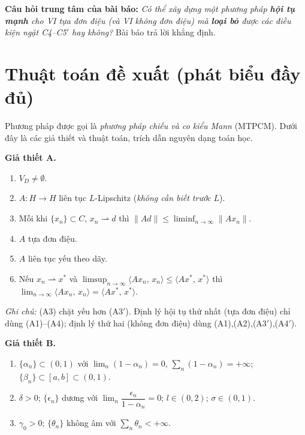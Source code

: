 \documentclass{MyBook}
\theoremstyle{plain}
\theoremstyle{definition}
\newcommand{\inp}[2]{\langle #1,\,#2\rangle}
\newcommand{\nm}[1]{\lVert #1\rVert}
\newcommand{\wto}{\rightharpoonup}
\begin{document}
\medskip
\noindent\textbf{Câu hỏi trung tâm của bài báo:} \emph{Có thể xây dựng một phương pháp \textbf{hội tụ mạnh} cho VI tựa đơn điệu (và VI không đơn điệu) mà \textbf{loại bỏ} được các điều kiện ngặt C4--C5$'$ hay không?} Bài báo trả lời khẳng định.

\chapter{Thuật toán đề xuất (phát biểu đầy đủ)}

Phương pháp được gọi là \emph{phương pháp chiếu và co kiểu Mann} (MTPCM). Dưới đây là các giả thiết và thuật toán, trích dẫn nguyên dạng toán học.

\medskip
\noindent\textbf{Giả thiết A.}
\begin{enumerate}[label=(A\arabic*),leftmargin=2.4em,itemsep=1pt]
\item $V_D\ne\emptyset$.
\item $A:H\to H$ liên tục $L$-Lipschitz (\emph{không cần biết trước} $L$).
\item Mỗi khi $\{x_n\}\subset C$, $x_n\wto d$ thì $\nm{Ad}\le\liminf_{n\to\infty}\nm{Ax_n}$.
\item $A$ tựa đơn điệu.
\item[(A3$'$)] $A$ liên tục yếu theo dãy.
\item[(A4$'$)] Nếu $x_n\wto x^{*}$ và $\limsup_{n\to\infty}\inp{Ax_n}{x_n}\le\inp{Ax^{*}}{x^{*}}$ thì $\lim_{n\to\infty}\inp{Ax_n}{x_n}=\inp{Ax^{*}}{x^{*}}$.
\end{enumerate}
\emph{Ghi chú:} (A3) chặt yếu hơn (A3$'$). Định lý hội tụ thứ nhất (tựa đơn điệu) chỉ dùng (A1)--(A4); định lý thứ hai (không đơn điệu) dùng (A1),(A2),(A3$'$),(A4$'$).

\medskip
\noindent\textbf{Giả thiết B.}
\begin{enumerate}[label=(B\arabic*),leftmargin=2.4em,itemsep=1pt]
\item $\{\alpha_n\}\subset(0,1)$ với $\lim_{n}(1-\alpha_n)=0$, $\sum_n(1-\alpha_n)=+\infty$; $\{\beta_n\}\subset[a,b]\subset(0,1)$.
\item $\delta>0$; $\{\epsilon_n\}$ dương với $\lim_n\dfrac{\epsilon_n}{1-\alpha_n}=0$; $l\in(0,2)$; $\sigma\in(0,1)$.
\item $\gamma_0>0$; $\{\theta_n\}$ không âm với $\sum_n\theta_n<+\infty$.
\end{enumerate}
\end{document}

